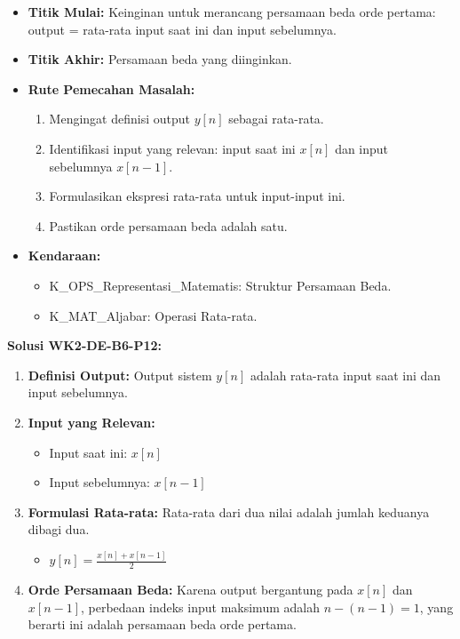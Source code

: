 \documentclass[
  letterpaper,
  DIV=11,
  numbers=noendperiod]{scrreprt}
\providecommand{\tightlist}{%
  \setlength{\itemsep}{0pt}\setlength{\parskip}{0pt}}
\begin{document}
\begin{itemize}
\tightlist
\item
  \textbf{Titik Mulai:} Keinginan untuk merancang persamaan beda orde
  pertama: output = rata-rata input saat ini dan input sebelumnya.
\item
  \textbf{Titik Akhir:} Persamaan beda yang diinginkan.
\item
  \textbf{Rute Pemecahan Masalah:}

  \begin{enumerate}
  \def\labelenumi{\arabic{enumi}.}
  \tightlist
  \item
    Mengingat definisi output \(y[n]\) sebagai rata-rata.
  \item
    Identifikasi input yang relevan: input saat ini \(x[n]\) dan input
    sebelumnya \(x[n-1]\).
  \item
    Formulasikan ekspresi rata-rata untuk input-input ini.
  \item
    Pastikan orde persamaan beda adalah satu.
  \end{enumerate}
\item
  \textbf{Kendaraan:}

  \begin{itemize}
  \tightlist
  \item
    K\_OPS\_Representasi\_Matematis: Struktur Persamaan Beda.
  \item
    K\_MAT\_Aljabar: Operasi Rata-rata.
  \end{itemize}
\end{itemize}

\textbf{Solusi WK2-DE-B6-P12:}

\begin{enumerate}
\def\labelenumi{\arabic{enumi}.}
\tightlist
\item
  \textbf{Definisi Output:} Output sistem \(y[n]\) adalah rata-rata
  input saat ini dan input sebelumnya.
\item
  \textbf{Input yang Relevan:}

  \begin{itemize}
  \tightlist
  \item
    Input saat ini: \(x[n]\)
  \item
    Input sebelumnya: \(x[n-1]\)
  \end{itemize}
\item
  \textbf{Formulasi Rata-rata:} Rata-rata dari dua nilai adalah jumlah
  keduanya dibagi dua.

  \begin{itemize}
  \tightlist
  \item
    \(y[n] = \frac{x[n] + x[n-1]}{2}\)
  \end{itemize}
\item
  \textbf{Orde Persamaan Beda:} Karena output bergantung pada \(x[n]\)
  dan \(x[n-1]\), perbedaan indeks input maksimum adalah
  \(n - (n-1) = 1\), yang berarti ini adalah persamaan beda orde
  pertama.
\end{enumerate}
\end{document}
